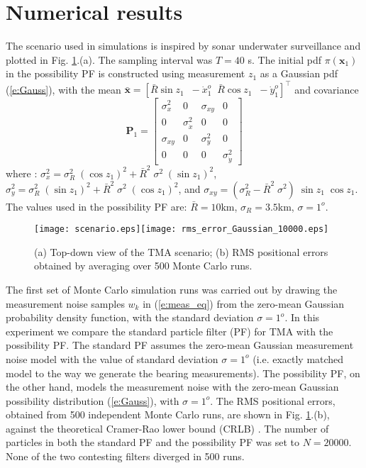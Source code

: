 \documentclass{llncs}
\newcommand{\xb}{\mathbf{x}}
\begin{document}
\section{Numerical results}
\label{V}
The scenario used in simulations is inspired by sonar underwater surveillance and plotted in Fig. \ref{f:2}.(a). The sampling interval was $T=40$ s. The initial pdf $\pi(\xb_1)$ in the possibility PF is constructed using measurement $z_1$ as a Gaussian pdf (\ref{e:Gauss}), with the mean $\bar{\xb} = [\bar{R}\sin z_1\;\;-\dot{x}_1^o \;\; \bar{R}\cos z_1\;\; -\dot{y}_1^o]^\intercal$ and covariance
\begin{equation}
\mathbf{P}_1 = \left[\begin{matrix} \sigma_x^2 &  0 & \sigma_{xy} & 0\\
                                          0 & \sigma_{\dot{x}}^2 & 0 & 0\\
                                          \sigma_{xy}  & 0    & \sigma_y^2 & 0\\
                                          0  & 0     & 0 &\sigma_{\dot{y}}^2\end{matrix}\right]
                                          \label{e:P0x}
                                          \end{equation}
where \cite{pfbook}:
$\sigma_{x}^2  =  \sigma_R^2\;(\cos z_1)^2 + \bar{R}^2\;\sigma^2\;(\sin z_1)^2$,
$\sigma_{y}^2  =  \sigma_R^2\;(\sin z_1)^2 + \bar{R}^2\;\sigma^2 \;(\cos z_1)^2$, and
$\sigma_{xy}  =  (\sigma_R^2 - \bar{R}^2 \;\sigma^2) \;\sin z_1\;\cos z_1$.
The values used in the possibility PF are: $\bar{R}=10$km, $\sigma_R = 3.5$km, $\sigma= 1^o$.
\begin{figure}[htb]
\centerline{\texttt{[image: scenario.eps]}\texttt{[image: rms\_error\_Gaussian\_10000.eps]}}
 \caption{(a) Top-down view of the TMA scenario; (b) RMS positional errors obtained by averaging over 500 Monte Carlo runs.  } \label{f:2}
\end{figure}

The first set of Monte Carlo simulation runs was carried out by drawing the measurement noise samples $w_k$ in (\ref{e:meas_eq}) from the zero-mean Gaussian probability density function, with the standard deviation $\sigma=1^o$. In this experiment we compare the standard particle filter (PF) for TMA \cite{pfbook} with the possibility PF. The standard PF assumes the zero-mean Gaussian measurement noise model with the value of standard deviation $\sigma=1^o$ (i.e. exactly matched model to the way we generate the bearing measurements). The possibility PF, on the other hand, models the measurement noise with the zero-mean Gaussian possibility distribution (\ref{e:Gauss}), with $\sigma=1^o$. The RMS positional errors, obtained from 500 independent Monte Carlo runs,  are shown in Fig. \ref{f:2}.(b), against the theoretical Cramer-Rao lower bound (CRLB) \cite{pfbook}. The number of particles in both the standard PF and the possibility PF was set to $N=20000$. None of the two contesting filters diverged in 500 runs.
\end{document}
